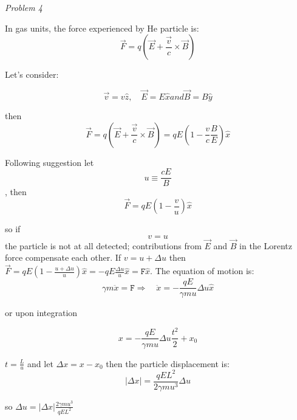 \begin{flushleft}
\textit{Problem 4}
\end{flushleft}
 In gas units, the force experienced by He particle is:
 \begin{equation*}
  \overrightarrow{F}=q(\overrightarrow{E}+\frac{\overrightarrow{v}}{c}\times\overrightarrow{B})
 \end{equation*}
 
Let's consider:

$$\overrightarrow{v}=v\widehat{z},\quad \overrightarrow{E}=E\widehat{x} and \overrightarrow{B}=B \widehat{y} $$

then $$\overrightarrow{F}=q(\overrightarrow{E}+\frac{\overrightarrow{v}}{c}\times\overrightarrow{B})=qE(1-\frac{v}{c}\frac{B}{E})\widehat{x}$$

Following suggestion let $$u\equiv\frac{cE}{B}$$, then 
\begin{equation}
 \overrightarrow{F}=qE(1-\frac{v}{u})\widehat{x}
\end{equation}

so if $$v=u$$ the particle is not at all detected; contributions from $\overrightarrow{E}$ and $\overrightarrow{B}$ in the Lorentz force compensate each other.
If $v=u+\Delta u$ then $\overrightarrow{F}=qE(1-\frac{u+\Delta u}{u})\widehat{x}=-qE\frac{\Delta u}{u}\widehat{x}= \texttt{F}\widehat{x}$.
The equation of motion is:
\begin{equation}
 \gamma m \ddot{x}=\texttt{F}\Rightarrow\quad\ddot{x}=-\frac{qE}{\gamma mu}\Delta u \widehat{x}
\end{equation}

or upon integration 

\begin{equation}
 x=-\frac{qE}{\gamma mu}\Delta u \frac{t^2}{2}+x_0
\end{equation}

$t=\frac{L}{u}$ and let $\Delta x =x-x_0$ then the particle displacement is:
\begin{equation*}
 |\Delta x|=\frac{qEL^2}{2\gamma m u^3} \Delta u
\end{equation*}

so $\Delta u =|\Delta x|\frac{2\gamma m u^3}{qEL^2}$

